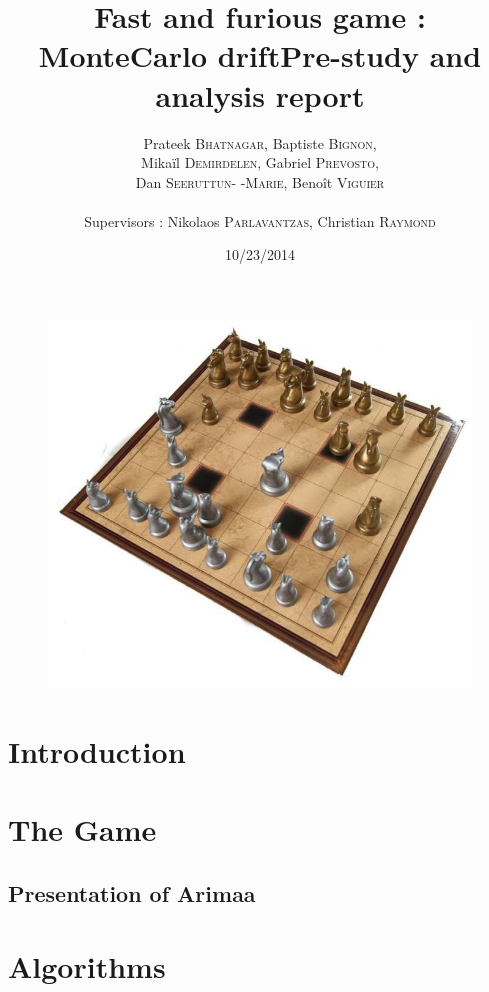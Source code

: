 \documentclass[12pt]{article}
\title{Fast and furious game : MonteCarlo drift\smallbreak Pre-study and analysis report}
\author{Prateek \textsc{Bhatnagar}, Baptiste \textsc{Bignon}, \\
        Mikaïl \textsc{Demirdelen}, Gabriel \textsc{Prevosto}, \\
        Dan \textsc{Seeruttun- -Marie}, Benoît \textsc{Viguier} \\
        \\
        Supervisors : Nikolaos \textsc{Parlavantzas}, Christian \textsc{Raymond}}
\date{10/23/2014}
\begin{document}
\maketitle

\begin{figure}[!h] 
\centerline{\includegraphics[scale=0.50]{img/arimaa}}
\end{figure}
\newpage
\begin{abstract}

\end{abstract}



\newpage
\tableofcontents
\newpage


\section*{Introduction}

\section{The Game}
\subsection{Presentation of Arimaa} 
\newpage
\section{Algorithms}
\end{document}
